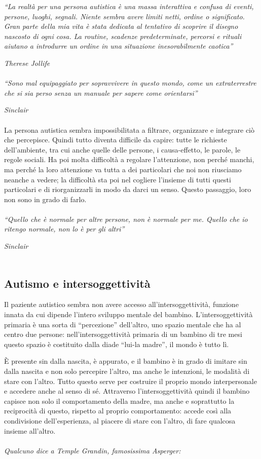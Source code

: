 \emph{``La realtà per una persona autistica è una massa interattiva e
confusa di eventi, persone, luoghi, segnali. Niente sembra avere limiti
netti, ordine o significato. Gran parte della mia vita è stata dedicata
al tentativo di scoprire il disegno nascosto di ogni cosa. La routine,
scadenze predeterminate, percorsi e rituali aiutano a introdurre un
ordine in una situazione inesorabilmente caotica'' }

\emph{Therese Jollife}
\\\\
\emph{``Sono mal equipaggiato per sopravvivere in questo mondo, come un
extraterrestre che si sia perso senza un manuale per sapere come
orientarsi'' }

\emph{Sinclair}
\\\\
La persona autistica sembra impossibilitata a filtrare, organizzare e
integrare ciò che percepisce. Quindi tutto diventa difficile da capire:
tutte le richieste dell'ambiente, tra cui anche quelle delle persone, i
causa-effetto, le parole, le regole sociali. Ha poi molta difficoltà a
regolare l'attenzione, non perché manchi, ma perché la loro attenzione
va tutta a dei particolari che noi non riusciamo neanche a vedere; la
difficoltà sta poi nel cogliere l'insieme di tutti questi particolari e
di riorganizzarli in modo da darci un senso. Questo passaggio, loro non
sono in grado di farlo.
\\\\
\emph{``Quello che è normale per altre persone, non è normale per me.
Quello che io ritengo normale, non lo è per gli altri'' }

\emph{Sinclair}
\\\\
\subsection{Autismo e intersoggettività}

Il paziente autistico sembra non avere accesso all'intersoggettività,
funzione innata da cui dipende l'intero sviluppo mentale del bambino.
L'intersoggettività primaria è una sorta di ``percezione'' dell'altro,
uno spazio mentale che ha al centro due persone: nell'intersoggettività
primaria di un bambino di tre mesi questo spazio è costituito dalla
diade ``lui-la madre'', il mondo è tutto lì.

È presente sin dalla nascita, è appurato, e il bambino è in grado di
imitare sin dalla nascita e non solo percepire l'altro, ma anche le
intenzioni, le modalità di stare con l'altro. Tutto questo serve per
costruire il proprio mondo interpersonale e accedere anche al senso di
sé. Attraverso l'intersoggettività quindi il bambino capisce non solo il
comportamento della madre, ma anche e soprattutto la reciprocità di
questo, rispetto al proprio comportamento: accede così alla condivisione
dell'esperienza, al piacere di stare con l'altro, di fare qualcosa
insieme all'altro.
\\\\
\emph{Qualcuno dice a Temple Grandin, famosissima Asperger: }

